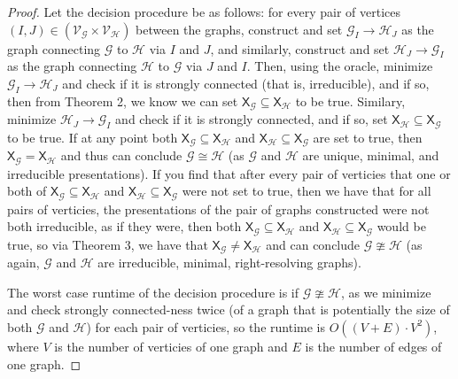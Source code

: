 \documentclass{article}
\newcommand{\Gc}{\mathcal{G}}  %
\newcommand{\Hc}{\mathcal{H}}  %
\newcommand{\Vc}{\mathcal{V}}
\newcommand{\shift}[1]{\mathsf{X}_{#1}}
\theoremstyle{definition}
\begin{document}
    \begin{proof}
        Let the decision procedure be as follows:
        for every pair of vertices
        \((I, J) \in (\Vc_\Gc \times \Vc_\Hc)\) between the graphs,
        construct and set \(\Gc_I\to\Hc_J\) as the graph connecting \(\Gc\) to \(\Hc\)
        via \(I\) and \(J\), and similarly, construct and set \(\Hc_J \to \Gc_I\) as the graph connecting 
        \(\Hc\) to \(\Gc\) via \(J\) and \(I\). Then,
        using the oracle, minimize \(\Gc_I \to \Hc_J\) and check if it is strongly connected (that is, irreducible),
        and if so, then from Theorem 2, we know we can 
        set \(\shift{\Gc} \subseteq \shift{\Hc}\) to be true.
        Similary, minimize \(\Hc_J \to \Gc_I\) and check if it is strongly connected, and 
        if so, set \(\shift{\Hc} \subseteq \shift{\Gc}\) to be true.
        If at any point both \(\shift{\Gc} \subseteq \shift{\Hc}\) and \(\shift{\Hc} \subseteq \shift{\Gc}\)
        are set to true, then \(\shift{\Gc} = \shift{\Hc}\) and thus can conclude \(\Gc \cong \Hc\) (as 
        \(\Gc\) and \(\Hc\) are unique, minimal, and irreducible presentations). If you find that 
        after every pair of verticies that one or both  
        of \(\shift{\Gc} \subseteq \shift{\Hc}\) and \(\shift{\Hc} \subseteq \shift{\Gc}\)
        were not set to true, then we have that for all pairs of verticies,
        the presentations of the pair of graphs constructed were not both 
        irreducible, as if they were, then both \(\shift{\Gc} \subseteq \shift{\Hc}\)
        and \(\shift{\Hc} \subseteq \shift{\Gc}\) would be true, so via Theorem 3, we have that \(\shift{\Gc} \neq \shift{\Hc}\)
        and can conclude \(\Gc \ncong \Hc\) (as again, \(\Gc\) and \(\Hc\) are irreducible, minimal, right-resolving 
        graphs).
        
        The worst case runtime of the decision procedure is if \(\Gc \ncong \Hc\),
        as we minimize and check strongly connected-ness twice 
        (of a graph that is potentially the size of both \(\Gc\) and \(\Hc\))
        for each pair of verticies, so the runtime is \(O((V+E)\cdot V^2)\),
        where \(V\) is the number of verticies of one graph and \(E\)
        is the number of edges of one graph.
    \end{proof}
\end{document}
